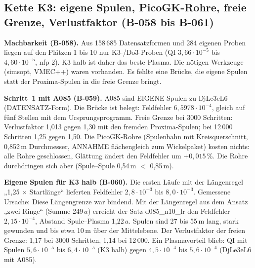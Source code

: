\subsection{Kette K3: eigene Spulen, PicoGK-Rohre, freie Grenze, Verlustfaktor (B-058 bis B-061)}
\textbf{Machbarkeit (B-058).} Aus 158\,685 Datensatzformen und 284 eigenen Proben liegen auf den Plätzen 1 bis 10 nur K3-/Do3-Proben (QI $3{,}66\cdot10^{-5}$ bis $4{,}60\cdot10^{-5}$, nfp 2).
K3 halb ist daher das beste Plasma. Die nötigen Werkzeuge (simsopt, VMEC++) waren vorhanden. Es fehlte eine Brücke, die eigene Spulen statt der Proxima-Spulen in die freie Grenze bringt.

\textbf{Schritt~1 mit A085 (B-059).} A085 sind EIGENE Spulen zu DjLe3eL6 (DATENSATZ-Form). Die Brücke ist belegt: Feldfehler $6{,}5978\cdot10^{-4}$, gleich auf fünf Stellen mit dem
Ursprungsprogramm. Freie Grenze bei 3000 Schritten: Verlustfaktor 1,013 gegen 1,30 mit den fremden Proxima-Spulen; bei 12\,000 Schritten 1,25 gegen 1,50. Die PicoGK-Rohre (Spulenbahn mit Kreisquerschnitt, 0,852\,m
Durchmesser, ANNAHME flächengleich zum Wickelpaket) kosten nichts: alle Rohre geschlossen, Glättung ändert den Feldfehler um $+0{,}015$\,\%. Die Rohre durchdringen sich aber (Spule--Spule 0,54\,m $<$ 0,85\,m).

\textbf{Eigene Spulen für K3 halb (B-060).} Die ersten Läufe mit der Längenregel „1,25 $\times$ Startlänge“ lieferten Feldfehler $2{,}8\cdot10^{-3}$ bis $8{,}0\cdot10^{-3}$. Gemessene Ursache: Diese Längengrenze war bindend. Mit der Längenregel
aus dem Ansatz „zwei Ringe“ (Summe 249\,$a$) erreicht der Satz d085\_n10\_lr den Feldfehler $2{,}15\cdot10^{-4}$, Abstand Spule--Plasma 1,22\,$a$. Spulen sind 27 bis 55\,m lang, stark gewunden und bis etwa 10\,m über der Mittelebene.
Der Verlustfaktor der freien Grenze: 1,17 bei 3000 Schritten, 1,14 bei 12\,000. Ein Plasmavorteil blieb: QI mit Spulen $5{,}6\cdot10^{-5}$ bis $6{,}4\cdot10^{-5}$ (K3 halb) gegen $4{,}5\cdot10^{-4}$ bis $5{,}6\cdot10^{-4}$ (DjLe3eL6 mit A085).

